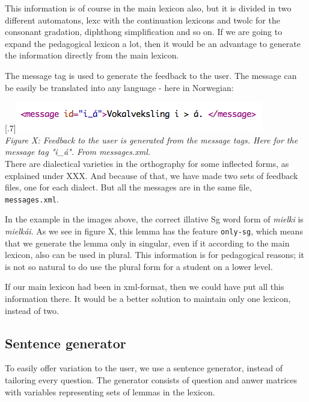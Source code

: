 \documentclass[a4paper,12pt]{article}
\begin{document}
This information is of course in the main lexicon also, but it is divided in two different automatons, lexc with the continuation lexicons and twolc for the consonant gradation, diphthong simplification and so on. If we are going to expand the pedagogical lexicon a lot, then it would be an advantage to generate the information directly from the main lexicon. 

The message tag is used to generate the feedback to the user. The message can be easily be translated into any language - here in Norwegian:

\scalebox{.7}[.7]{\includegraphics{img/messages.png}}\\
\textit{Figure X: Feedback to the user is generated from the message tags. Here for the message tag "i\_á". From messages.xml.}\\

There are dialectical varieties in the orthography for some inflected forms, as explained under XXX. And because of that, we have made two sets of feedback files, one for each dialect. But all the messages are in the same file, \texttt{messages.xml}.

In the example in the images above, the correct illative Sg word form of \textit{mielki} is \textit{mielkái}. As we see in figure X, this lemma has the feature \texttt{only-sg}, which means that we generate the lemma only in singular, even if it according to the main lexicon, also can be used in plural. This information is for pedagogical reasons; it is not so natural to do use the plural form for a student on a lower level.

If our main lexicon had been in xml-format, then we could have put all this information there. It would be a better solution to maintain only one lexicon, instead of two.

\subsection{Sentence generator}
To easily offer variation to the user, we use a sentence generator, instead of tailoring every question. The generator consists of question and anwer matrices with variables representing sets of lemmas in the lexicon.
\end{document}
